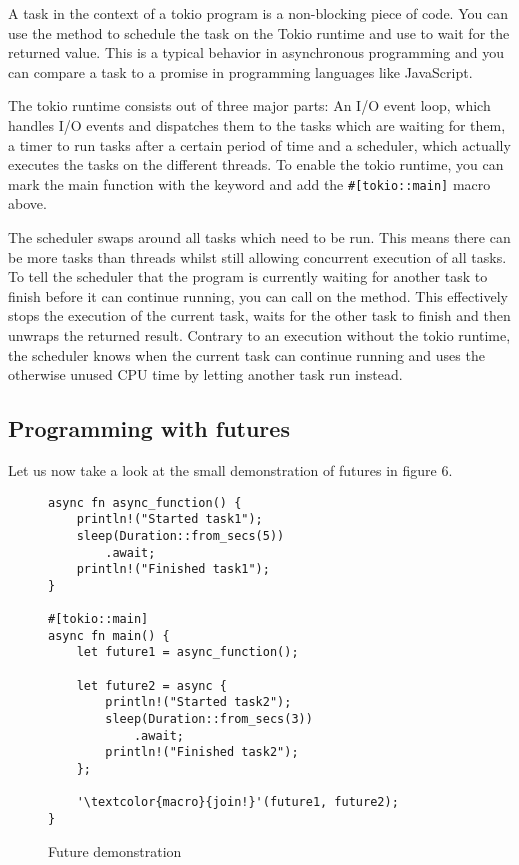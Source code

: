 A task in the context of a tokio program is a non-blocking piece of code. You can use the 
method to schedule the task on the Tokio runtime and use  to wait for the returned value. This is a typical
behavior in asynchronous programming and you can compare a task to a promise in programming languages like JavaScript.

The tokio runtime consists out of three major parts: An I/O event loop, which handles I/O events and dispatches them to
the tasks which are waiting for them, a timer to run tasks after a certain period of time and  a scheduler, which
actually executes the tasks on the different threads. To enable the tokio runtime, you can mark the main function with
the  keyword and add the \texttt{#[tokio::main]} macro above.

The scheduler swaps around all tasks which need to be run. This means there can be more tasks than threads whilst still
allowing concurrent execution of all tasks. To tell the scheduler that the program is currently waiting for another
task to finish before it can continue running, you can call  on the method. This effectively stops the
execution of the current task, waits for the other task to finish and then unwraps the returned result. Contrary to an
execution without the tokio runtime, the scheduler knows when the current task can continue running and uses the
otherwise unused CPU time by letting another task run instead.

\subsection{Programming with futures}
Let us now take a look at the small demonstration of futures in figure 6.

\begin{figure}[ht]
    \begin{verbatim}
async fn async_function() {
    println!("Started task1");
    sleep(Duration::from_secs(5))
        .await;
    println!("Finished task1");
}

#[tokio::main]
async fn main() {
    let future1 = async_function();

    let future2 = async {
        println!("Started task2");
        sleep(Duration::from_secs(3))
            .await;
        println!("Finished task2");
    };

    '\textcolor{macro}{join!}'(future1, future2);
}
    \end{verbatim}
    \caption{Future demonstration}
\end{figure}

